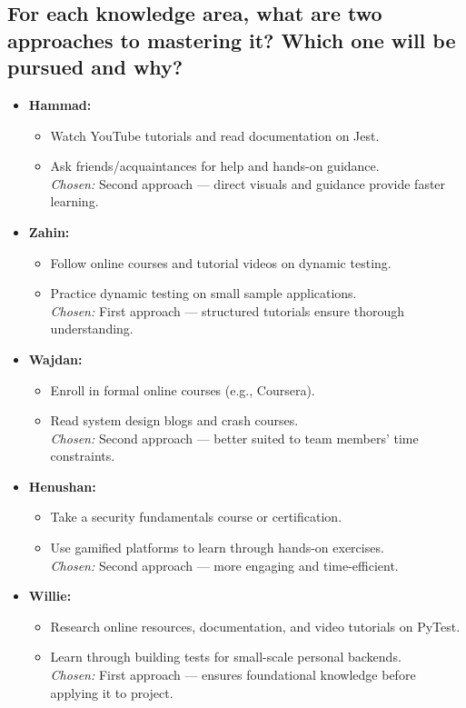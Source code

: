 \documentclass[12pt, titlepage]{article}
\begin{document}
\subsection*{For each knowledge area, what are two approaches to mastering it? Which one will be pursued and why?}

\begin{itemize}
    \item \textbf{Hammad:} 
    \begin{itemize}
        \item Watch YouTube tutorials and read documentation on Jest.
        \item Ask friends/acquaintances for help and hands-on guidance. \\
        \textit{Chosen:} Second approach — direct visuals and guidance provide faster learning.
    \end{itemize}
    
    \item \textbf{Zahin:}
    \begin{itemize}
        \item Follow online courses and tutorial videos on dynamic testing.
        \item Practice dynamic testing on small sample applications. \\
        \textit{Chosen:} First approach — structured tutorials ensure thorough understanding.
    \end{itemize}

    \item \textbf{Wajdan:}
    \begin{itemize}
        \item Enroll in formal online courses (e.g., Coursera).
        \item Read system design blogs and crash courses. \\
        \textit{Chosen:} Second approach — better suited to team members' time constraints.
    \end{itemize}

    \item \textbf{Henushan:}
    \begin{itemize}
        \item Take a security fundamentals course or certification.
        \item Use gamified platforms to learn through hands-on exercises. \\
        \textit{Chosen:} Second approach — more engaging and time-efficient.
    \end{itemize}

    \item \textbf{Willie:}
    \begin{itemize}
        \item Research online resources, documentation, and video tutorials on PyTest.
        \item Learn through building tests for small-scale personal backends. \\
        \textit{Chosen:} First approach — ensures foundational knowledge before applying it to project.
    \end{itemize}
\end{itemize}
\end{document}
